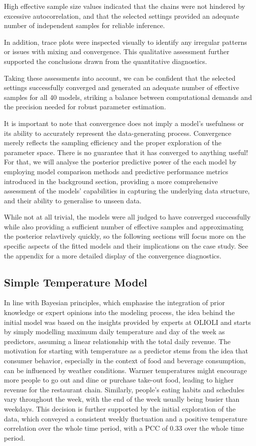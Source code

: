 High effective sample size values indicated that the chains were not hindered
by excessive autocorrelation, and that the selected settings provided an
adequate number of independent samples for reliable inference.

In addition, trace plots were inspected visually to identify any irregular
patterns or issues with mixing and convergence. This qualitative assessment
further supported the conclusions drawn from the quantitative diagnostics.

Taking these assessments into account, we can be confident that the selected
settings successfully converged and generated an adequate number of effective
samples for all 40 models, striking a balance between computational demands and
the precision needed for robust parameter estimation.

It is important to note that convergence does not imply a model's usefulness or
its ability to accurately represent the data-generating process. Convergence
merely reflects the sampling efficiency and the proper exploration of the
parameter space. There is no guarantee that it has converged to anything
useful! For that, we will analyse the posterior predictive power of the each
model by employing model comparison methods and predictive performance metrics
introduced in the background section, providing a more comprehensive assessment
of the models' capabilities in capturing the underlying data structure, and
their ability to generalise to unseen data.

While not at all trivial, the models were all judged to have converged
successfully while also providing a sufficient number of effective samples and
approximating the posterior relavtively quickly, so the following sections will
focus more on the specific aspects of the fitted models and their implications
on the case study. See the appendix for a more detailed display of the
convergence diagnostics.

\subsection{Simple Temperature Model}
In line with Bayesian principles, which emphasise the integration of prior
knowledge or expert opinions into the modeling process, the idea behind the
initial model was based on the insights provided by experts at OLIOLI and
starts by simply modelling maximum daily temperature and day of the week as
predictors, assuming a linear relationship with the total daily revenue. The
motivation for starting with temperature as a predictor stems from the idea
that consumer behavior, especially in the context of food and beverage
consumption, can be influenced by weather conditions. Warmer temperatures might
encourage more people to go out and dine or purchase take-out food, leading to
higher revenue for the restaurant chain. Similarly, people's eating habits and
schedules vary throughout the week, with the end of the week usually being
busier than weekdays. This decision is further supported by the initial
exploration of the data, which conveyed a consistent weekly fluctuation and a
positive temperature correlation over the whole time period, with a PCC
of 0.33 over the whole time period.

